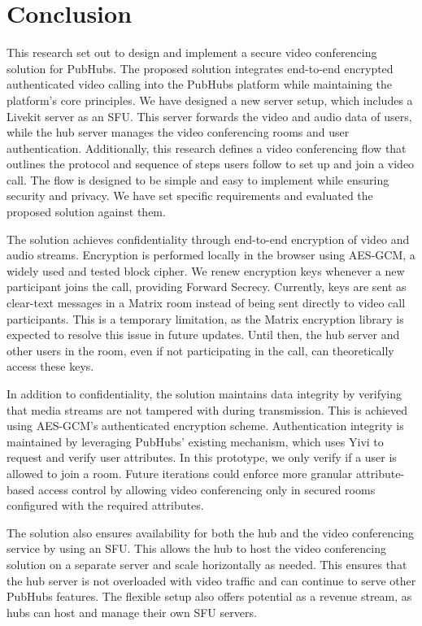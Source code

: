 \documentclass{report}
\begin{document}
\chapter{Conclusion}
This research set out to design and implement a secure video conferencing solution for PubHubs. The proposed
solution integrates end-to-end encrypted authenticated video calling into the PubHubs platform while maintaining
the platform's core principles. We have designed a new server setup, which includes a Livekit server as an SFU.
This server forwards the video and audio data of users, while the hub server manages the video conferencing rooms
and user authentication. Additionally, this research defines a video conferencing flow that outlines the protocol
and sequence of steps users follow to set up and join a video call. The flow is designed to be simple and easy to
implement while ensuring security and privacy. We have set specific requirements and evaluated the proposed
solution against them.

The solution achieves confidentiality through end-to-end encryption of video and audio streams. Encryption is
performed locally in the browser using AES-GCM, a widely used and tested block cipher. We renew encryption keys
whenever a new participant joins the call, providing Forward Secrecy. Currently, keys are sent as clear-text
messages in a Matrix room instead of being sent directly to video call participants. This is a temporary
limitation, as the Matrix encryption library is expected to resolve this issue in future updates. Until then, the
hub server and other users in the room, even if not participating in the call, can theoretically access these keys.

In addition to confidentiality, the solution maintains data integrity by verifying that media streams are not
tampered with during transmission. This is achieved using AES-GCM’s authenticated encryption scheme. Authentication
integrity is maintained by leveraging PubHubs’ existing mechanism, which uses Yivi to request and verify user
attributes. In this prototype, we only verify if a user is allowed to join a room. Future iterations could enforce
more granular attribute-based access control by allowing video conferencing only in secured rooms configured with
the required attributes.

The solution also ensures availability for both the hub and the video conferencing service by using an SFU. This
allows the hub to host the video conferencing solution on a separate server and scale horizontally as needed. This
ensures that the hub server is not overloaded with video traffic and can continue to serve other PubHubs features.
The flexible setup also offers potential as a revenue stream, as hubs can host and manage their own SFU servers.
\end{document}
